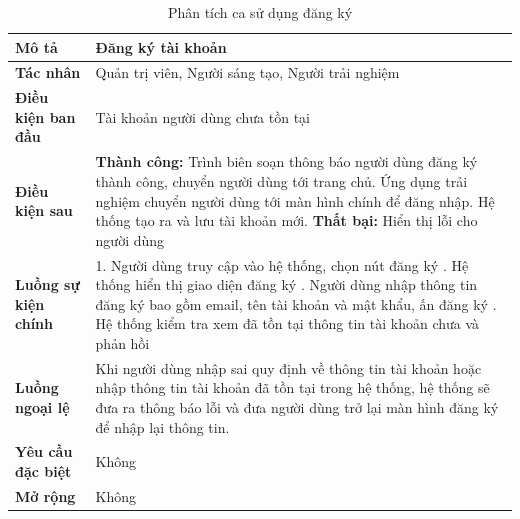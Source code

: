 \begin{table}
\centering
\caption{Phân tích ca sử dụng đăng ký}
\begin{tabular}{|p{4cm}|p{10cm}|}
    \hline
\textbf{Mô tả} & Đăng ký tài khoản \\ \hline
\textbf{Tác nhân} & Quản trị viên, Người sáng tạo, Người trải nghiệm \\ \hline
\textbf{Điều kiện ban đầu} & Tài khoản người dùng chưa tồn tại \\ \hline
\textbf{Điều kiện sau} & \textbf{Thành công:} Trình biên soạn thông báo người dùng đăng ký thành công, chuyển  
người dùng tới trang chủ. Ứng dụng trải
nghiệm chuyển người dùng tới màn hình
chính để đăng nhập. Hệ thống tạo ra và
lưu tài khoản mới. \newline
\textbf{Thất bại:} Hiển thị lỗi cho người dùng \\ \hline
\textbf{Luồng sự kiện chính} &
1. Người dùng truy cập vào hệ
thống, chọn nút đăng ký \newline
2. Hệ thống hiển thị giao diện đăng
ký \newline
3. Người dùng nhập thông tin đăng
ký bao gồm email, tên tài khoản
và mật khẩu, ấn đăng ký \newline
4. Hệ thống kiểm tra xem đã tồn tại
thông tin tài khoản chưa và phản
hồi \newline \\ \hline
\textbf{Luồng ngoại lệ} & Khi người dùng nhập sai quy định về thông tin tài khoản hoặc nhập thông tin tài khoản đã tồn tại trong hệ thống, hệ thống sẽ đưa ra thông báo lỗi và đưa người dùng trở lại màn hình đăng ký để nhập lại thông tin. \\ \hline
\textbf{Yêu cầu đặc biệt} & Không \\ \hline
\textbf{Mở rộng} & Không \\ \hline
\end{tabular}
\end{table}

